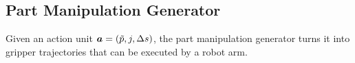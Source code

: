 





\subsection{Part Manipulation Generator}
\label{policy_method}



Given an action unit ${\bm{a}} = (\tilde{p}, j, \Delta s)$, the part manipulation generator turns it into gripper trajectories that can be executed by a robot arm.

